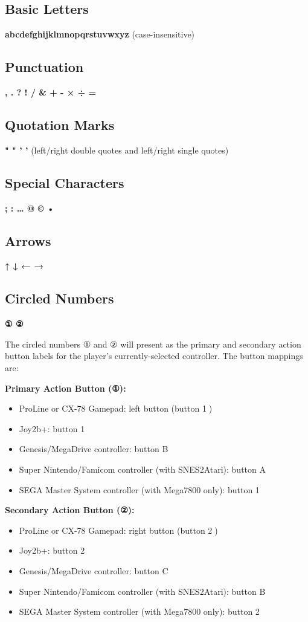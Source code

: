 \documentclass[11pt,letterpaper,oldstylefigures]{memoir}
\newcommand{\fountain}[1]{\textbf{#1}}
\begin{document}
\subsection{Basic Letters}
\fountain{abcdefghijklmnopqrstuvwxyz} (case-insensitive)

\subsection{Punctuation}
\fountain{, . ? ! / \& + - × ÷ =}

\subsection{Quotation Marks}
\fountain{" " ' '} (left/right double quotes and left/right single quotes)

\subsection{Special Characters}
\fountain{; : … @ © •}

\subsection{Arrows}
\fountain{↑ ↓ ← →}

\subsection{Circled Numbers}
\fountain{① ②}

The circled numbers ① and ② will present as the primary and secondary action button labels for the player's currently-selected controller. The button mappings are:

\textbf{Primary Action Button (①):}
\begin{itemize}
\item ProLine or CX-78 Gamepad: left button (button \textcircled{1})
\item Joy2b+: button \textcircled{1}
\item Genesis/MegaDrive controller: button \textcircled{B}
\item Super Nintendo/Famicom controller (with SNES2Atari): button \textcircled{A}
\item SEGA Master System controller (with Mega7800 only): button \textcircled{1}
\end{itemize}
\textbf{Secondary Action Button (②):}
\begin{itemize}
\item ProLine or CX-78 Gamepad: right button (button \textcircled{2})
\item Joy2b+: button \textcircled{2}
\item Genesis/MegaDrive controller: button \textcircled{C}
\item Super Nintendo/Famicom controller (with SNES2Atari): button \textcircled{B}
\item SEGA Master System controller (with Mega7800 only): button \textcircled{2}
\end{itemize}
\end{document}
